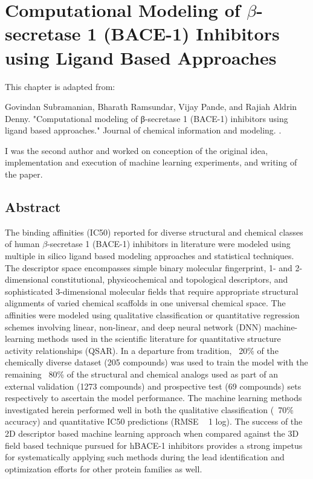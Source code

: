 \section{Computational Modeling of $\beta$-secretase 1 (BACE-1) Inhibitors using Ligand Based Approaches}

This chapter is adapted from: 

Govindan Subramanian, Bharath Ramsundar, Vijay Pande, and Rajiah Aldrin Denny. "Computational modeling of β-secretase 1 (BACE-1) inhibitors using ligand based approaches." Journal of chemical information and modeling. \cite{subramanian2016computational}.

I was the second author and worked on conception of the original idea, implementation and execution of machine learning experiments, and writing of the paper.

\subsection{Abstract}
The binding affinities (IC50) reported for diverse structural and chemical classes of human $\beta$-secretase 1 (BACE-1) inhibitors in literature were modeled using multiple in silico ligand based modeling approaches and statistical techniques.  The descriptor space encompasses simple binary molecular fingerprint, 1- and 2-dimensional constitutional, physicochemical and topological descriptors, and sophisticated 3-dimensional molecular fields that require appropriate structural alignments of varied chemical scaffolds in one universal chemical space.  The affinities were modeled using qualitative classification or quantitative regression schemes involving linear, non-linear, and deep neural network (DNN) machine-learning methods used in the scientific literature for quantitative structure activity relationships (QSAR).  In a departure from tradition, ~20\% of the chemically diverse dataset (205 compounds) was used to train the model with the remaining ~80\% of the structural and chemical analogs used as part of an external validation (1273 compounds) and prospective test (69 compounds) sets respectively to ascertain the model performance.  The machine learning methods investigated herein performed well in both the qualitative classification (~70\% accuracy) and quantitative IC50 predictions (RMSE ~ 1 log).  The success of the 2D descriptor based machine learning approach when compared against the 3D field based technique pursued for hBACE-1 inhibitors provides a strong impetus for systematically applying such methods during the lead identification and optimization efforts for other protein families as well.


